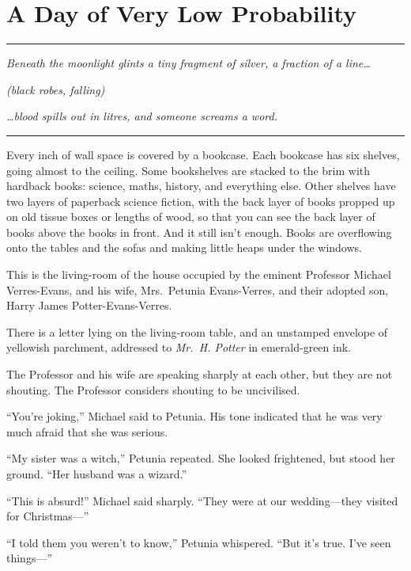 \chapter{A Day of Very Low Probability}

\begin{center}\rule{3in}{0.4pt}\end{center}

\emph{Beneath the moonlight glints a tiny fragment of silver, a fraction
of a line\ldots{}}

\emph{(black robes, falling)}

\emph{\ldots{}blood spills out in litres, and someone screams a word.}

\begin{center}\rule{3in}{0.4pt}\end{center}

Every inch of wall space is covered by a bookcase. Each bookcase has six
shelves, going almost to the ceiling. Some bookshelves are stacked to
the brim with hardback books: science, maths, history, and everything
else. Other shelves have two layers of paperback science fiction, with
the back layer of books propped up on old tissue boxes or lengths of
wood, so that you can see the back layer of books above the books in
front. And it still isn't enough. Books are overflowing onto the tables
and the sofas and making little heaps under the windows.

This is the living-room of the house occupied by the eminent Professor
Michael Verres-Evans, and his wife, Mrs.~Petunia Evans-Verres, and their
adopted son, Harry James Potter-Evans-Verres.

There is a letter lying on the living-room table, and an unstamped
envelope of yellowish parchment, addressed to \emph{Mr.~H. Potter} in
emerald-green ink.

The Professor and his wife are speaking sharply at each other, but they
are not shouting. The Professor considers shouting to be uncivilised.

``You're joking,'' Michael said to Petunia. His tone indicated that he
was very much afraid that she was serious.

``My sister was a witch,'' Petunia repeated. She looked frightened, but
stood her ground. ``Her husband was a wizard.''

``This is absurd!'' Michael said sharply. ``They were at our
wedding---they visited for Christmas---''

``I told them you weren't to know,'' Petunia whispered. ``But it's true.
I've seen things---''

